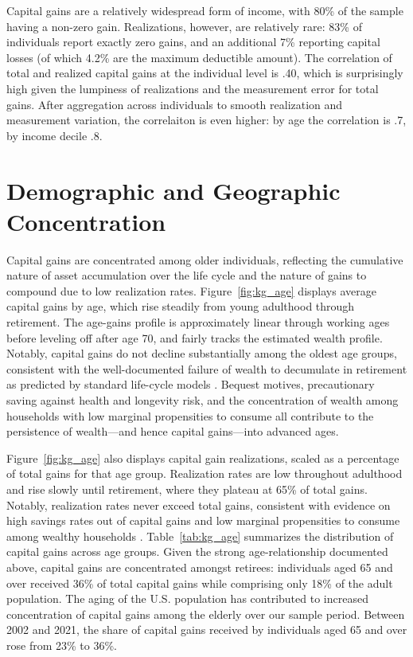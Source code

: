 \documentclass[12pt]{article}
\begin{document}
 Capital gains are a relatively widespread form of income, with 80\% of the sample having a non-zero gain. Realizations, however, are relatively rare: 83\% of individuals report exactly zero gains, and an additional 7\% reporting capital losses (of which 4.2\% are the maximum deductible amount). The correlation of total and realized capital gains at the individual level is .40, which is surprisingly high given the lumpiness of realizations and the measurement error for total gains. After aggregation across individuals to smooth realization and measurement variation, the correlaiton is even higher: by age the correlation is .7, by income decile .8. 


\section{Demographic and Geographic Concentration}

Capital gains are concentrated among older individuals, reflecting the cumulative nature of asset accumulation over the life cycle and the nature of gains to compound due to low realization rates. Figure~\ref{fig:kg_age} displays average capital gains by age, which rise steadily from young adulthood through retirement. The age-gains profile is approximately linear through working ages before leveling off after age 70, and fairly tracks the estimated wealth profile. Notably, capital gains do not decline substantially among the oldest age groups, consistent with the well-documented failure of wealth to decumulate in retirement as predicted by standard life-cycle models \citep{denardi2004wealth}. Bequest motives, precautionary saving against health and longevity risk, and the concentration of wealth among households with low marginal propensities to consume all contribute to the persistence of wealth---and hence capital gains---into advanced ages. 

Figure~\ref{fig:kg_age} also displays capital gain realizations, scaled as a percentage of total gains for that age group. Realization rates are low throughout adulthood and rise slowly until retirement, where they plateau at 65\% of total gains. Notably, realization rates never exceed total gains, consistent with evidence on high savings rates out of capital gains and low marginal propensities to consume among wealthy households \citep{dimaggio2020stock,fagereng2019saving,bach2020rich}. Table~\ref{tab:kg_age} summarizes the distribution of capital gains across age groups. Given the strong age-relationship documented above, capital gains are concentrated amongst retirees: individuals aged 65 and over received 36\% of total capital gains while comprising only 18\% of the adult population. The aging of the U.S. population has contributed to increased concentration of capital gains among the elderly over our sample period. Between 2002 and 2021, the share of capital gains received by individuals aged 65 and over rose from 23\% to 36\%. 
\end{document}

